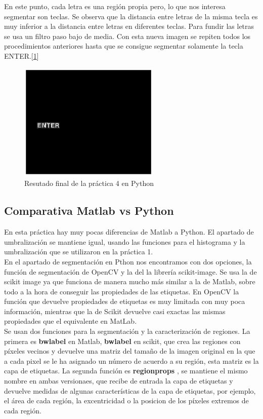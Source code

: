 \documentclass[a4paper,12pt]{report}
\begin{document}
En este punto, cada letra es una región propia pero, lo que nos interesa segmentar son teclas. Se observa que la distancia entre letras de la misma tecla es muy inferior a la distancia entre letras en diferentes teclas. Para fundir las letras se usa un filtro paso bajo de media. Con esta nueva imagen se repiten todos los procedimientos anteriores hasta que se consigue segmentar solamente la tecla ENTER.[\ref{finp4}]

\begin{figure}[h]
\centering
\includegraphics[width=0.6\textwidth]{imagenes/finp4}
\caption{Resutado final de la práctica 4 en Python}
\label{finp4}
\end{figure}


\subsection{Comparativa Matlab vs Python}

En esta práctica hay muy pocas diferencias de Matlab a Python. El apartado de umbralización se mantiene igual, usando las funciones para el histograma y la umbralización que se utilizaron en la práctica 1.\\

En el apartado de segmentación en Pthon nos encontramos con dos opciones, la función de segmentación de OpenCV y la del la librería scikit-image. Se usa la de scikit image ya que funciona de manera mucho más similar a la de Matlab, sobre todo a la hora de conseguir las propiedades de las etiquetas. En OpenCV la función que devuelve propiedades de etiquetas es muy limitada con muy poca información, mientras que la de Scikit devuelve casi exactas las mismas propiedades que el equivalente en MatLab.\\


 Se usan dos funciones para la segmentación y la caracterización de regiones. La primera es \textbf{bwlabel} en Matlab, \textbf{bwlabel} en scikit,  que crea las regiones con píxeles vecinos y devuelve una matriz del tamaño de la imagen original en la que a cada pixel se le ha asignado un número de acuerdo a su región, esta matriz es la capa de etiquetas. La segunda función es \textbf{regionprops} , se mantiene el mismo nombre en ambas versionaes, que recibe de entrada la capa de etiquetas y devuelve medidas de algunas características de la capa de etiquetas, por ejemplo, el área de cada región, la excentricidad o la posicion de los píxeles extremos de cada región.\\
\end{document}

